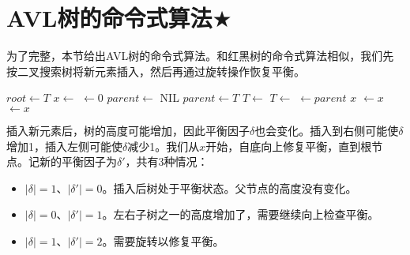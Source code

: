 \documentclass[b5paper]{ctexart}
\begin{document}
\begin{Exercise}
\end{Exercise}

\section{AVL树的命令式算法$\bigstar$}

为了完整，本节给出AVL树的命令式算法。和红黑树的命令式算法相似，我们先按二叉搜索树将新元素插入，然后再通过旋转操作恢复平衡。

\begin{algorithmic}[1]
  \State $root \gets T$
  \State $x \gets$ 
  \State {} $\gets 0$
  \State $parent \gets$ NIL
    \State $parent \gets T$
      \State $T \gets $ 
    \Else
      \State $T \gets $ 
    \EndIf
  \EndWhile
  \State {} $\gets parent$
   
    \State \Return $x$
    \State {} $\gets x$
  \Else
    \State {} $\gets x$
  \EndIf
  \State \Return {}
\EndFunction
\end{algorithmic}

插入新元素后，树的高度可能增加，因此平衡因子$\delta$也会变化。插入到右侧可能使$\delta$增加1，插入左侧可能使$\delta$减少1。我们从$x$开始，自底向上修复平衡，直到根节点。记新的平衡因子为$\delta'$，共有3种情况：

\begin{itemize}
\item $|\delta| = 1$、$|\delta'| = 0$。插入后树处于平衡状态。父节点的高度没有变化。

\item $|\delta| = 0$、$|\delta'| = 1$。左右子树之一的高度增加了，需要继续向上检查平衡。

\item $|\delta| = 1$、$|\delta'| = 2$。需要旋转以修复平衡。
\end{itemize}
\end{document}
